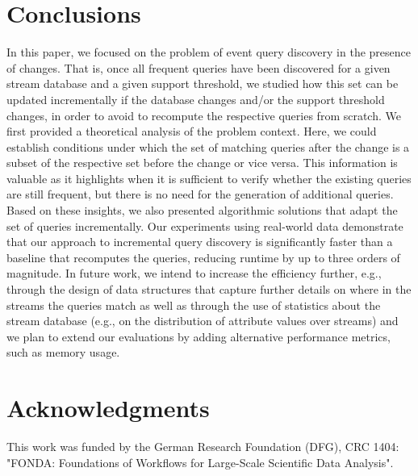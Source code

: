 \documentclass[english]{lni}
\begin{document}







\section{Conclusions}
\label{sec:conclusions}

In this paper, we focused on the problem of event query discovery in the presence of
changes. That is, once all frequent queries have been discovered for a given stream
database and a given support threshold, we studied how this set can be updated
incrementally if the database changes and/or the support threshold changes, in order to
avoid to recompute the respective queries from scratch. We first provided a theoretical
analysis of the problem context. Here, we could establish conditions under which the set
of matching queries after the change is a subset of the respective set before the
change or vice versa. This information is valuable as it highlights when it is sufficient to verify
whether the existing queries are still frequent, but there is no need for the generation
of additional queries. Based on these insights, we also presented algorithmic solutions
that adapt the set of queries incrementally. Our experiments using real-world data
demonstrate that our approach to incremental query
discovery is significantly faster than a baseline that recomputes the queries, reducing
runtime by up to three orders of magnitude. In future work, we intend to
increase the efficiency further,
e.g., through the design of data structures that capture further details on where in the
streams the queries match as well as through the use of statistics about the stream
database (e.g., on the distribution of attribute values over streams) and we plan to extend
our evaluations by adding alternative performance metrics, such as memory usage.


\section*{Acknowledgments}
 This work was funded by the German Research
Foundation (DFG), CRC 1404: "FONDA: Foundations of
Workflows for Large-Scale Scientific Data Analysis".


\end{document}
